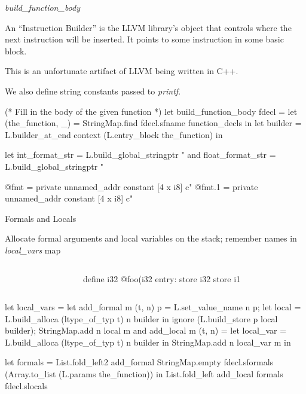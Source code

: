 \documentclass{plt}
\begin{document}
\begin{frame}[fragile=singleslide]{\emph{build\_function\_body}}

An ``Instruction Builder'' is the LLVM library's object that controls
where the next instruction will be inserted.  It points to some
instruction in some basic block.

This is an unfortunate artifact of LLVM being written in C++.

We also define string constants passed to \emph{printf}.

\begin{ocaml}
(* Fill in the body of the given function *)
let build_function_body fdecl =
  let (the_function, _) =
     StringMap.find fdecl.sfname function_decls in
  let builder =
     L.builder_at_end context (L.entry_block the_function) in

  let int_format_str =
     L.build_global_stringptr "%
  and float_format_str =
     L.build_global_stringptr "%
\end{ocaml}

\begin{llvm}
@fmt = private unnamed_addr constant [4 x i8] c"%
@fmt.1 = private unnamed_addr constant [4 x i8] c"%
\end{llvm}

\end{frame}

\begin{frame}[fragile=singleslide]{Formals and Locals}

Allocate formal arguments and local variables on the stack; remember
names in \emph{local\_vars} map

\begin{columns}
\begin{column}{0.5\textwidth}
\begin{C}
int foo(int a, bool b)
{
  int c;
  bool d;
\end{C}
\end{column}
\begin{column}{0.5\textwidth}
\begin{llvm}
define i32 @foo(i32 %
entry:
  store i32 %
  store i1 %
\end{llvm}
\end{column}
\end{columns}

\begin{ocaml}    
let local_vars =
  let add_formal m (t, n) p = 
    L.set_value_name n p;
    let local = L.build_alloca (ltype_of_typ t) n builder in
    ignore (L.build_store p local builder);
    StringMap.add n local m
  and add_local m (t, n) =
	let local_var = L.build_alloca (ltype_of_typ t) n builder
	in StringMap.add n local_var m in
	
  let formals = List.fold_left2 add_formal StringMap.empty
    fdecl.sformals (Array.to_list (L.params the_function)) in
  List.fold_left add_local formals fdecl.slocals
\end{ocaml}
\end{frame}
\end{document}
